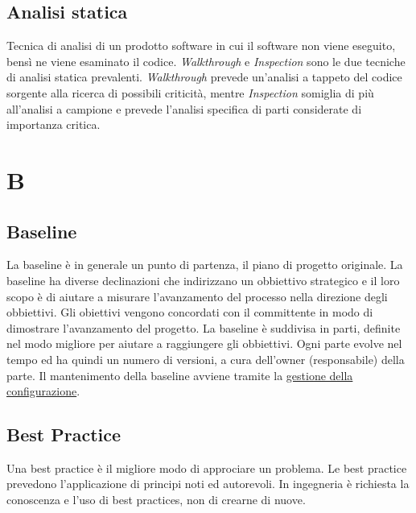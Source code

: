 	\subsection{Analisi statica}
	\label{sec:analisistatica}
	Tecnica di analisi di un prodotto software in cui il software non viene eseguito, bensì ne viene esaminato il codice.
	\emph{Walkthrough} e \emph{Inspection} sono le due tecniche di analisi statica prevalenti. \emph{Walkthrough} prevede un'analisi a tappeto del codice sorgente alla ricerca di possibili criticità, mentre \emph{Inspection} somiglia di più all'analisi a campione e prevede l'analisi specifica di parti considerate di importanza critica.
	
	\section{B}
	\subsection{Baseline}
	\label{sec:baseline}
	La baseline è in generale un punto di partenza, il piano di progetto originale. La baseline ha diverse declinazioni che indirizzano un obbiettivo strategico e il loro scopo è di aiutare a misurare l'avanzamento del processo nella direzione degli obbiettivi. Gli obiettivi vengono concordati con il committente in modo di dimostrare l'avanzamento del progetto. La baseline è suddivisa in parti, definite nel modo migliore per aiutare a raggiungere gli obbiettivi. Ogni parte evolve nel tempo ed ha quindi un numero di versioni, a cura dell'owner (responsabile) della parte. Il mantenimento della baseline avviene tramite la \hyperref[sec:controlloconfigurazione]{gestione della configurazione}. 
	
	\subsection{Best Practice}
	\label{sec:bestpractice}
	Una best practice è il migliore modo di approciare un problema. Le best practice prevedono l'applicazione di principi noti ed autorevoli. In ingegneria è richiesta la conoscenza e l'uso di best practices, non di crearne di nuove.

